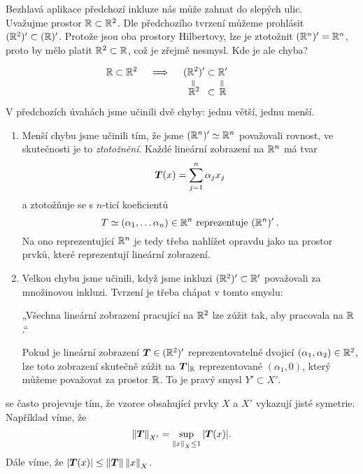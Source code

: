 \begin{example}
Bezhlavá aplikace předchozí inkluze nás může zahnat do slepých ulic.
\\
Uvažujme prostor $\mathbb{R} \subset \mathbb{R}^2$. Dle předchozího tvrzení můžeme prohlásit $(\mathbb{R}^2)' \subset (\mathbb{R})'$. Protože jsou oba prostory Hilbertovy, lze je ztotožnit $(\mathbb{R}^n)' = \mathbb{R}^n $, proto by mělo platit $\mathbb{R}^2 \subset \mathbb{R}$, což je zřejmě nesmysl. Kde je ale chyba?

\begin{align*}
    \hspace{-3em}
    \R \subset \R^2 \quad \implies \quad
    (\R^2)' &\subset \R' \\[-5pt]
    \mask{(\R^2)'}{\rotatebox[origin=c]{90}{=}} &\ph{\subset} \;\; \mask{\R'}{\rotatebox[origin=c]{90}{=}} \\[-5pt]\mask{(\R^2)'}{\R^2} &\subset \mask{\R'}{\R}
\end{align*}
V předchozích úvahách jsme učinili dvě chyby: jednu větší, jednu menší. \begin{enumerate}
    \item Menší chybu jsme učinili tím, že jsme $(\mathbb{R}^n)' \simeq \mathbb{R}^n$ považovali rovnost, ve skutečnosti je to \textit{ztotožnění}. Každé lineární zobrazení na $\mathbb{R}^n$ má tvar $$\boldsymbol{T}(x) = \sum_{j=1}^n \alpha_j x_j$$ a ztotožňuje se s $n$-ticí koeficientů $$T \simeq (\alpha_1, \dots \alpha_n) \in \mathbb{R}^n \text{ reprezentuje } (\mathbb{R}^n)' \: .$$ Na ono reprezentující $\mathbb{R}^n$ je tedy třeba nahlížet opravdu jako na prostor prvků, které reprezentují lineární zobrazení.
    \item Velkou chybu jsme učinili, když jsme inkluzi $(\mathbb{R}^2)' \subset \mathbb{R}'$ považovali za množinovou inkluzi. Tvrzení je třeba chápat v tomto smyslu:
    
    \begin{center}
    „Všechna lineární zobrazení pracující na $\mathbb{R}^2$ lze zúžit tak, aby pracovala na $\mathbb{R}$.“
    \end{center}
    
    Pokud je lineární zobrazení $\boldsymbol{T} \in (\mathbb{R}^2)'$ reprezentovatelné dvojicí $(\alpha_1, \alpha_2) \in \mathbb{R}^2$, lze toto zobrazení skutečně zúžit na $\boldsymbol{T}|_{\mathbb{R}}$ reprezentované $(\alpha_1, 0)$, který můžeme považovat za prostor $\mathbb{R}$. To je pravý smysl  $Y' \subset X'$.
\end{enumerate}
\end{example}

\bigskip

\begin{remark}
 se často projevuje tím, že vzorce obsahující prvky $X$ a $X'$ vykazují jisté symetrie. Například víme, že
$$\left\lVert\boldsymbol{T}\right\rVert_{X'} = \sup_{\left\lVert x\right\rVert_X \leq 1} |\boldsymbol{T}(x)|.$$
Dále víme, že $|\boldsymbol{T}(x)| \leq \left\lVert\boldsymbol{T}\right\rVert \left\lVert x\right\rVert_X$. 
\end{remark}

